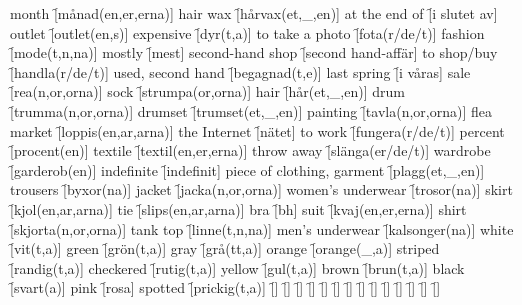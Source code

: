 \begin{questions}
    \begin{multicols}{2}
        \raggedcolumns
        \question month \f[månad(en,er,erna)]
        \question hair wax \f[hårvax(et,\_,en)]
        \question at the end of \f[i slutet av]
        \question outlet \f[outlet(en,s)]
        \question expensive \f[dyr(t,a)]
        \question to take a photo \f[fota(r/de/t)]
        \question fashion \f[mode(t,n,na)]
        \question mostly \f[mest]
        \question second-hand shop \f[second hand-affär]
        \question to shop/buy \f[handla(r/de/t)]
        \question used, second hand \f[begagnad(t,e)]
        \question last spring \f[i våras]
        \question sale \f[rea(n,or,orna)]
        \question sock \f[strumpa(or,orna)]
        \question hair \f[hår(et,\_,en)]
        \question drum \f[trumma(n,or,orna)]
        \question drumset \f[trumset(et,\_,en)]
        \question painting \f[tavla(n,or,orna)]
        \question flea market \f[loppis(en,ar,arna)]
        \question the Internet \f[nätet]
        \question to work \f[fungera(r/de/t)]
        \question percent \f[procent(en)]
        \question textile \f[textil(en,er,erna)]
        \question throw away \f[slänga(er/de/t)]
        \question wardrobe \f[garderob(en)]
        \question indefinite \f[indefinit]
        \question piece of clothing, garment \f[plagg(et,\_,en)]
        \question trousers \f[byxor(na)]
        \question jacket \f[jacka(n,or,orna)]
        \question women's underwear \f[trosor(na)]
        \question skirt \f[kjol(en,ar,arna)]
        \question tie \f[slips(en,ar,arna)]
        \question bra \f[bh]
        \question suit \f[kvaj(en,er,erna)]
        \question shirt \f[skjorta(n,or,orna)]
        \question tank top \f[linne(t,n,na)]
        \question men's underwear \f[kalsonger(na)]
        \question white \f[vit(t,a)]
        \question green \f[grön(t,a)]
        \question gray \f[grå(tt,a)]
        \question orange \f[orange(\_,a)]
        \question striped \f[randig(t,a)]
        \question checkered \f[rutig(t,a)]
        \question yellow \f[gul(t,a)]
        \question brown \f[brun(t,a)]
        \question black \f[svart(a)]
        \question pink \f[rosa]
        \question spotted \f[prickig(t,a)]
        \question  \f[]
        \question  \f[]
        \question  \f[]
        \question  \f[]
        \question  \f[]
        \question  \f[]
        \question  \f[]
        \question  \f[]
        \question  \f[]
        \question  \f[]
        \question  \f[]
        \question  \f[]
        \question  \f[]
        \question  \f[]

\end{multicols}
\end{questions}
